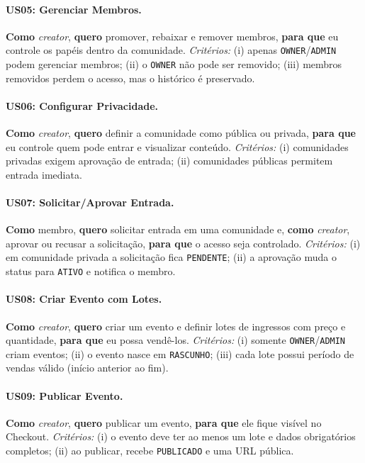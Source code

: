 \documentclass[12pt, a4paper]{article}
\begin{document}
\paragraph{US05: Gerenciar Membros.}
\textbf{Como} \textit{creator}, \textbf{quero} promover, rebaixar e remover
membros, \textbf{para que} eu controle os papéis dentro da comunidade.
\textit{Critérios:} (i) apenas \texttt{OWNER}/\texttt{ADMIN} podem gerenciar
membros; (ii) o \texttt{OWNER} não pode ser removido; (iii) membros removidos
perdem o acesso, mas o histórico é preservado.

\paragraph{US06: Configurar Privacidade.}
\textbf{Como} \textit{creator}, \textbf{quero} definir a comunidade como pública
ou privada, \textbf{para que} eu controle quem pode entrar e visualizar
conteúdo. \textit{Critérios:} (i) comunidades privadas exigem aprovação de
entrada; (ii) comunidades públicas permitem entrada imediata.

\paragraph{US07: Solicitar/Aprovar Entrada.}
\textbf{Como} membro, \textbf{quero} solicitar entrada em uma comunidade e,
\textbf{como} \textit{creator}, aprovar ou recusar a solicitação, \textbf{para
que} o acesso seja controlado. \textit{Critérios:} (i) em comunidade privada a
solicitação fica \texttt{PENDENTE}; (ii) a aprovação muda o status para
\texttt{ATIVO} e notifica o membro.

\paragraph{US08: Criar Evento com Lotes.}
\textbf{Como} \textit{creator}, \textbf{quero} criar um evento e definir lotes de
ingressos com preço e quantidade, \textbf{para que} eu possa vendê-los.
\textit{Critérios:} (i) somente \texttt{OWNER}/\texttt{ADMIN} criam eventos;
(ii) o evento nasce em \texttt{RASCUNHO}; (iii) cada lote possui período de
vendas válido (início anterior ao fim).

\paragraph{US09: Publicar Evento.}
\textbf{Como} \textit{creator}, \textbf{quero} publicar um evento,
\textbf{para que} ele fique visível no Checkout. \textit{Critérios:} (i) o
evento deve ter ao menos um lote e dados obrigatórios completos; (ii) ao
publicar, recebe \texttt{PUBLICADO} e uma URL pública.
\end{document}

